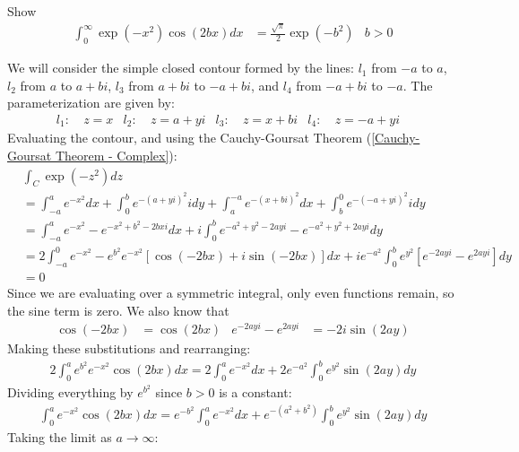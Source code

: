 \documentclass[12pt, english]{book}
\makeatletter
\renewenvironment{proof}[1][\proofname]{\par
	\pushQED{\qed}%
	\normalfont \topsep6\p@\@plus6\p@\relax
	\list{}{%
		\settowidth{\leftmargin}{\itshape\proofname:\hskip\labelsep}%
		\setlength{\labelwidth}{0pt}%
		\setlength{\itemindent}{-\leftmargin}%
		}%
	\item[\hskip\labelsep\itshape#1\@addpunct{:}]\ignorespaces
	}{\popQED\endlist\@endpefalse}
\makeatother
\begin{document}
	\begin{example}
		Show
		\begin{align*}
			\int_{0}^{\infty} \exp(-x^2) \cos(2bx) dx &= \frac{\sqrt{\pi}}{2} \exp(-b^2) 
				& b>0
		\end{align*}
		\begin{proof}
			{\color{Grey}
			We will consider the simple closed contour formed by the lines: \(l_1\) from \(-a\) to \(a\), \(l_2\) from \(a\) to \(a + bi\), \(l_3\) from \(a+bi\) to \(-a+bi\), and \(l_4\) from \(-a+bi\) to \(-a\). The parameterization are given by:
			\begin{align*}
				l_1:& \ z=x	&
				l_2:& \ z=a+yi &
				l_3:& \ z=x+bi &
				l_4:& \ z=-a+yi &
			\end{align*}
			Evaluating the contour, and using the Cauchy-Goursat Theorem (\cref{Cauchy-Goursat Theorem - Complex}):
			\begin{align*}
				&\int_{C} \exp(-z^2) dz \\
				&= \int_{-a}^{a} e^{-x^2} dx + \int_{0}^{b} e^{-(a+yi)^2} i dy + \int_{a}^{-a} e^{-(x+bi)^2} dx + \int_{b}^{0} e^{-(-a+yi)^2} i dy \\
				&= \int_{-a}^{a} e^{-x^2} - e^{-x^2 + b^2 - 2bxi} dx 
					+ i \int_{0}^{b} e^{-a^2 + y^2 - 2ayi} - e^{-a^2 + y^2 + 2ayi} dy\\
				&= 2\int_{-a}^{0} e^{-x^2} - e^{b^2} e^{-x^2} [\cos(-2bx) + i\sin(-2bx)] dx 
					+ i e^{-a^2} \int_{0}^{b} e^{y^2}[e^{-2ayi} - e^{2ayi}] dy \\
				&= 0
			\end{align*}
			Since we are evaluating over a symmetric integral, only even functions remain, so the sine term is zero. We also know that 
			\begin{align*}
				\cos(-2bx) &= \cos(2bx) & e^{-2ayi} - e^{2ayi} &= -2i\sin(2ay)
			\end{align*}
			Making these substitutions and rearranging:
			\begin{align*}
				2\int_{0}^{a} e^{b^2} e^{-x^2} \cos(2bx) dx 
				= 2 \int_{0}^{a} e^{-x^2} dx + 2 e^{-a^2} \int_{0}^{b} e^{y^2} \sin(2ay) dy
			\end{align*}
			Dividing everything by \(e^{b^2}\) since \(b>0\) is a constant:
			\begin{align*}
				\int_{0}^{a} e^{-x^2} \cos(2bx) dx 
				 = e^{-b^2} \int_{0}^{a} e^{-x^2} dx 
				 	+ e^{-(a^2 + b^2)} \int_{0}^{b} e^{y^2} \sin(2ay) dy
			\end{align*}
			Taking the limit as \(a \rightarrow \infty\):
			\begin{align*}

\end{align*}}
\end{proof}
\end{example}
\end{document}
